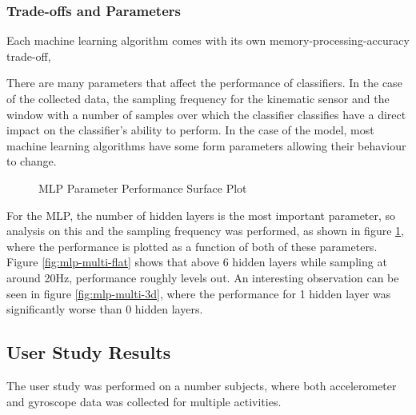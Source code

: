 
\subsubsection{Trade-offs and Parameters}

Each machine learning algorithm comes with its own memory-processing-accuracy trade-off, 

There are many parameters that affect the performance of classifiers. In the case of the collected data, the sampling frequency for the kinematic sensor and the window with a number of samples over which the classifier classifies have a direct impact on the classifier's ability to perform. In the case of the model, most machine learning algorithms have some form parameters allowing their behaviour to change. 

\begin{figure}
	\centering
	\caption{MLP Parameter Performance Surface Plot \label{fig:mlp-multi}}
\end{figure}

For the MLP, the number of hidden layers is the most important parameter, so analysis on this and the sampling frequency was performed, as shown in figure \ref{fig:mlp-multi}, where the performance is plotted as a function of both of these parameters. Figure \ref{fig:mlp-multi-flat} shows that above 6 hidden layers while sampling at around 20Hz, performance roughly levels out. An interesting observation can be seen in figure \ref{fig:mlp-multi-3d}, where the performance for 1 hidden layer was significantly worse than 0 hidden layers.

\subsection{User Study Results}
The user study was performed on a number  subjects, where both accelerometer and gyroscope data was collected for multiple activities.

